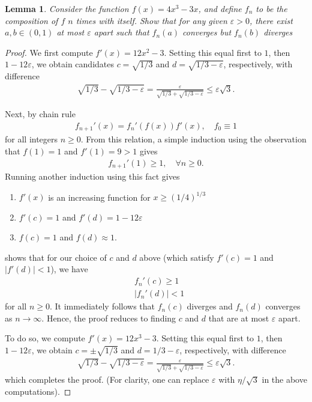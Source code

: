 \documentclass[12pt,reqno]{amsart}
\numberwithin{equation}{section}  %
\newcommand{\ee}{\varepsilon}
\newtheorem{lemma}[theorem]{Lemma}
\begin{document}
\begin{lemma}
Consider the function $f(x) = 4x^3 - 3x$, and define $f_n$ to be
the composition of $f$ $n$ times with itself. Show that
for any given $\ee > 0$, there exist $a,b \in (0,1)$ at most $\ee$ apart
such that $f_n(a)$ converges but $f_n(b)$ diverges
\end{lemma}
\begin{proof}
We first compute $f'(x) = 12x^2 - 3$. Setting this equal first
to $1$, then $1- 12\ee$, we obtain candidates $c = \sqrt{1/3}$ and $d =
\sqrt{1/3 - \ee}$, respectively, with difference 
\begin{align*}
\sqrt{1/3} - \sqrt{1/3 - \ee} = \frac{\ee}{\sqrt{1/3} + \sqrt{1/3 - \ee}} \le
\ee \sqrt{3}.
\end{align*}

Next, by chain rule
\begin{align*}
f_{n+1}'(x) = f_n'(f(x)) f'(x), \quad f_0 \equiv 1
\end{align*}
for all integers $n \ge 0$.
From this relation, a simple induction 
using the observation that $f(1) = 1$ and $f'(1) = 9 > 1$
gives
\begin{align*}
f_{n+1}'(1) \ge 1, \quad \forall n\ge0.
\end{align*}
Running another induction using this fact gives
\begin{enumerate}
\item
$f'(x)$ is an increasing function for $x \ge (1/4)^{1/3}$ 
\item
$f'(c)=1$ and $f'(d) = 1 - 12 \ee$
\item
$f(c) = 1$ and $f(d) \approx 1$.
\end{enumerate}
shows that for our choice of $c$ and $d$ above
(which satisfy $f'(c) = 1$ and $|f'(d)| < 1$), we have
\begin{align*}
& f_{n}'(c) \ge 1 \\
& | f_{n}'(d) |  < 1
\end{align*}
for all $n \ge 0$. 
It immediately follows that $f_n(c)$ diverges and $f_n(d)$ converges
as $n \to \infty$. Hence, the proof reduces to finding $c$ and $d$ 
that are at most $\ee$ apart.


To do so, we compute $f'(x) = 12x^3 - 3$. Setting this equal first
to $1$, then $1- 12\ee$, we obtain $c = \pm \sqrt{1/3}$ and $d = 1/3 - \ee$,
respectively, with difference 
\begin{align*}
\sqrt{1/3} - \sqrt{1/3 - \ee} = \frac{\ee}{\sqrt{1/3} + \sqrt{1/3 - \ee}} \le
\ee \sqrt{3}.
\end{align*}
which completes the proof. (For clarity, one can replace $\ee$ with
$\eta/\sqrt{3}$ in the above computations). 
\end{proof}

        
\end{document}
